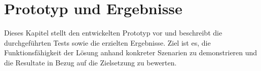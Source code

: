 
\chapter{Prototyp und Ergebnisse\authorA}


Dieses Kapitel stellt den entwickelten Prototyp vor und beschreibt die durchgeführten Tests sowie die erzielten Ergebnisse. Ziel ist es, die Funktionsfähigkeit der Lösung anhand konkreter Szenarien zu demonstrieren und die Resultate in Bezug auf die Zielsetzung zu bewerten.




